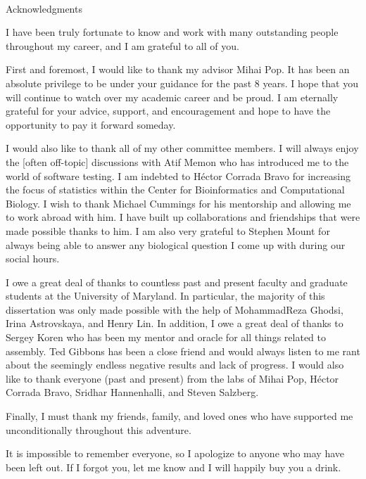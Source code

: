 
\renewcommand{\baselinestretch}{2}
\small\normalsize
\hbox{\ }

\vspace{-.65in}

\begin{center}
\large{Acknowledgments}
\end{center}

\vspace{1ex}

I have been truly fortunate to know and work with many outstanding people throughout my career, and I am grateful to all of you.

First and foremost, I would like to thank my advisor Mihai Pop.
It has been an absolute privilege to be under your guidance for the past 8 years.
I hope that you will continue to watch over my academic career and be proud.
I am eternally grateful for your advice, support, and encouragement and hope to have the opportunity to pay it forward someday.

I would also like to thank all of my other committee members. I will always enjoy the [often off-topic] discussions with Atif Memon who has introduced me to the world of software testing.
I am indebted to H\'{e}ctor Corrada Bravo for increasing the focus of statistics within the Center for Bioinformatics and Computational Biology.
I wish to thank Michael Cummings for his mentorship and allowing me to work abroad with him.
I have built up collaborations and friendships that were made possible thanks to him.
I am also very grateful to Stephen Mount for always being able to answer any biological question I come up with during our social hours.

I owe a great deal of thanks to countless past and present faculty and graduate students at the University of Maryland.
In particular, the majority of this dissertation was only made possible with the help of MohammadReza Ghodsi, Irina Astrovskaya, and Henry Lin.
In addition, I owe a great deal of thanks to Sergey Koren who has been my mentor and oracle for all things related to assembly.
Ted Gibbons has been a close friend and would always listen to me rant about the seemingly endless negative results and lack of progress.
I would also like to thank everyone (past and present) from the labs of Mihai Pop, H\'{e}ctor Corrada Bravo, Sridhar Hannenhalli, and Steven Salzberg.

Finally, I must thank my friends, family, and loved ones who have supported me unconditionally throughout this adventure.

It is impossible to remember everyone, so I apologize to anyone who may have been left out. If I forgot you, let me know and I will happily buy you a drink.
